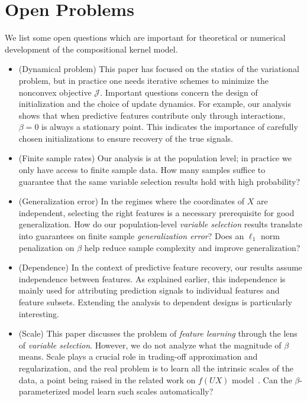 \documentclass[sn-mathphys-num]{sn-jnl}%
\numberwithin{equation}{section}
\theoremstyle{thmstyleone}%
\theoremstyle{thmstyletwo}%
\theoremstyle{thmstylethree}%
\begin{document}
\section{Open Problems} 
\label{sec:open-questions}
We list some open questions which are important for theoretical or numerical development of 
the compositional kernel model. 


\vspace{.5em}
\begin{itemize}
\item (Dynamical problem)
This paper has focused on the statics of the variational problem, but in practice one needs iterative schemes to minimize the nonconvex objective $\mathcal{J}$. Important questions concern the design of initialization and the choice of update dynamics. For example, our analysis shows that when predictive features contribute only through interactions, $\beta = 0$ is always a stationary point. This indicates the importance of carefully chosen initializations to ensure recovery of the true signals.




\vspace{.5em}
\item (Finite sample rates)   
Our analysis is at the population level; in practice we only have access to finite sample data. How many samples suffice to guarantee that the same variable selection results hold with high probability?  


 
\vspace{.5em}
\item (Generalization error) 
In the regimes where the coordinates of $X$ are independent, selecting the right features is a necessary prerequisite for good generalization. How do our population-level \emph{variable selection} results translate into guarantees on finite sample \emph{generalization error}? Does an $\ell_1$ norm penalization on $\beta$ help reduce sample complexity and improve generalization?   

\vspace{.5em}
\item (Dependence) 
In the context of predictive feature recovery, our results assume independence between features. As explained earlier, this independence is mainly used for attributing prediction signals to individual features and feature subsets. Extending the analysis to dependent designs is particularly interesting.

\vspace{.5em}
\item (Scale)  
This paper discusses the problem of \emph{feature learning} through the lens of \emph{variable selection}. However, we do not analyze what the magnitude of $\beta$ means. Scale plays a crucial role in trading-off approximation and regularization, and the real problem is to learn all the intrinsic scales of the data, a point being raised in the related work on $f(UX)$ model~\cite{LiRu25}. Can the $\beta$-parameterized model learn such scales automatically? 



\end{itemize}
\end{document}
